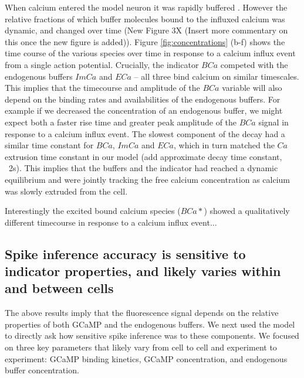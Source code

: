 \documentclass[a4paper,12pt]{article}
\theoremstyle{definition}
\begin{document}
When calcium entered the model neuron it was rapidly buffered \cite{bartol}. However the relative fractions of which buffer molecules bound to the influxed calcium was dynamic, and changed over time (New Figure 3X (Insert more commentary on this once the new figure is added)). Figure \ref{fig:concentrations} (b-f) shows the time course of the various species over time in response to a calcium influx event from a single action potential. Crucially, the indicator $BCa$ competed with the endogenous buffers $ImCa$ and $ECa$ – all three bind calcium on similar timescales. This implies that the timecourse and amplitude of the $BCa$ variable will also depend on the binding rates and availabilities of the endogenous buffers. For example if we decreased the concentration of an endogenous buffer, we might expect both a faster rise time and greater peak amplitude of the $BCa$ signal in response to a calcium influx event. The slowest component of the decay had a similar time constant for $BCa$, $ImCa$ and $ECa$, which in turn matched the $Ca$ extrusion time constant in our model (add approximate decay time constant, ~2s). This implies that the buffers and the indicator had reached a dynamic equilibrium and were jointly tracking the free calcium concentration as calcium was slowly extruded from the cell.

Interestingly the excited bound calcium species ($BCa*$) showed a qualitatively different timecourse in response to a calcium influx event...

\subsection{Spike inference accuracy is sensitive to indicator properties, and likely varies within and between cells}
The above results imply that the fluorescence signal depends on the relative properties of both GCaMP and the endogenous buffers. We next used the model to directly ask how sensitive spike inference was to these components. We focused on three key parameters that likely vary from cell to cell and experiment to experiment: GCaMP binding kinetics, GCaMP concentration, and endogenous buffer concentration.
\end{document}
